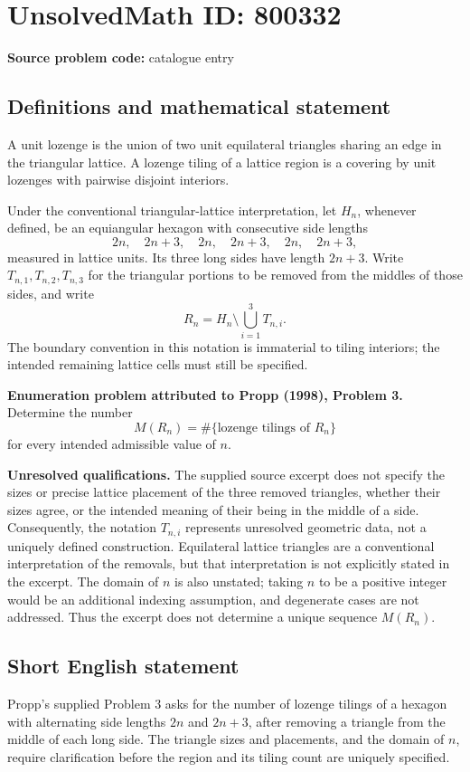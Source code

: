 \documentclass[11pt]{article}
\begin{document}
\section*{UnsolvedMath ID: 800332}
\textbf{Source problem code:} catalogue entry
\subsection{Definitions and mathematical statement}
A unit lozenge is the union of two unit equilateral triangles sharing an edge in the triangular lattice. A lozenge tiling of a lattice region is a covering by unit lozenges with pairwise disjoint interiors.

Under the conventional triangular-lattice interpretation, let \(H_n\), whenever defined, be an equiangular hexagon with consecutive side lengths
\[
2n,\quad 2n+3,\quad 2n,\quad 2n+3,\quad 2n,\quad 2n+3,
\]
measured in lattice units. Its three long sides have length \(2n+3\). Write \(T_{n,1},T_{n,2},T_{n,3}\) for the triangular portions to be removed from the middles of those sides, and write
\[
R_n=H_n\setminus\bigcup_{i=1}^{3}T_{n,i}.
\]
The boundary convention in this notation is immaterial to tiling interiors; the intended remaining lattice cells must still be specified.

\textbf{Enumeration problem attributed to Propp (1998), Problem 3.} Determine the number
\[
M(R_n)=\#\{\text{lozenge tilings of }R_n\}
\]
for every intended admissible value of \(n\).

\textbf{Unresolved qualifications.} The supplied source excerpt does not specify the sizes or precise lattice placement of the three removed triangles, whether their sizes agree, or the intended meaning of their being in the middle of a side. Consequently, the notation \(T_{n,i}\) represents unresolved geometric data, not a uniquely defined construction. Equilateral lattice triangles are a conventional interpretation of the removals, but that interpretation is not explicitly stated in the excerpt. The domain of \(n\) is also unstated; taking \(n\) to be a positive integer would be an additional indexing assumption, and degenerate cases are not addressed. Thus the excerpt does not determine a unique sequence \(M(R_n)\).
\subsection{Short English statement}
Propp's supplied Problem 3 asks for the number of lozenge tilings of a hexagon with alternating side lengths \(2n\) and \(2n+3\), after removing a triangle from the middle of each long side. The triangle sizes and placements, and the domain of \(n\), require clarification before the region and its tiling count are uniquely specified.
\end{document}
